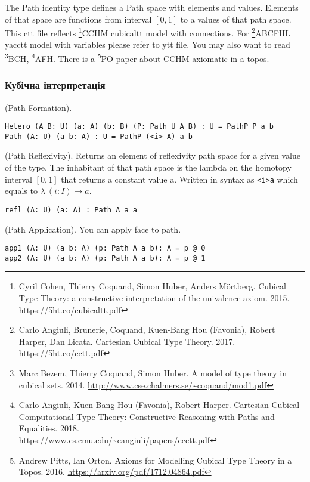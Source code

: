 The Path identity type defines a Path space with elements and values.
Elements of that space are functions from interval $[0,1]$ to a values of that path space.
This ctt file reflects \footnote{Cyril Cohen, Thierry Coquand, Simon Huber, Anders M{\"{o}}rtberg. Cubical Type Theory: a constructive interpretation of the univalence axiom. 2015. \url{https://5ht.co/cubicaltt.pdf}}{CCHM} cubicaltt model with connections.
For \footnote{Carlo Angiuli, Brunerie, Coquand, Kuen-Bang Hou (Favonia), Robert Harper, Dan Licata. Cartesian Cubical Type Theory. 2017. \url{https://5ht.co/cctt.pdf}}{ABCFHL} yacctt model with
variables please refer to ytt file. You may also want to
read \footnote{Marc Bezem, Thierry Coquand, Simon Huber. A model of type theory in cubical sets. 2014. \url{http://www.cse.chalmers.se/~coquand/mod1.pdf}}{BCH},
\footnote{Carlo Angiuli, Kuen-Bang Hou (Favonia), Robert Harper. Cartesian Cubical Computational Type Theory: Constructive Reasoning with Paths and Equalities. 2018. \\ \url{https://www.cs.cmu.edu/~cangiuli/papers/ccctt.pdf}}{AFH}.
There is a \footnote{Andrew Pitts, Ian Orton. Axioms for Modelling Cubical Type Theory in a Topos. 2016. \url{https://arxiv.org/pdf/1712.04864.pdf}}{PO} paper about CCHM axiomatic in a topos.

\subsubsection{Кубічна інтерпретація}

\begin{definition} (Path Formation).
\begin{lstlisting}
Hetero (A B: U) (a: A) (b: B) (P: Path U A B) : U = PathP P a b
Path (A: U) (a b: A) : U = PathP (<i> A) a b
\end{lstlisting}
\end{definition}

\begin{definition} (Path Reflexivity).
Returns an element of reflexivity path space for a given value of the type.
The inhabitant of that path space is the lambda on the homotopy
interval $[0,1]$ that returns a constant value a. Written in
syntax as \lstinline{<i>a} which equals to $\lambda\ (i: I) \rightarrow a$.
\begin{lstlisting}
refl (A: U) (a: A) : Path A a a
\end{lstlisting}
\end{definition}

\begin{definition} (Path Application).
You can apply face to path.
\begin{lstlisting}
app1 (A: U) (a b: A) (p: Path A a b): A = p @ 0
app2 (A: U) (a b: A) (p: Path A a b): A = p @ 1
\end{lstlisting}
\end{definition}

